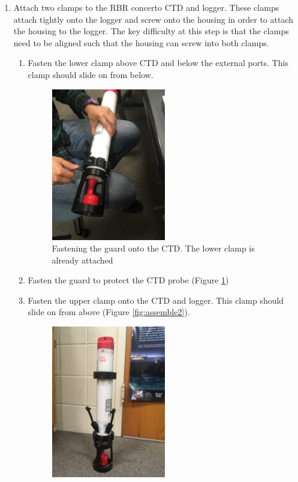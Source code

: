 \documentclass[13pt]{article}
\begin{document}
\begin{enumerate}
    \item Attach two clamps to the RBR concerto CTD and logger. These clamps attach tightly onto the logger and screw onto the housing in order to attach the housing to the logger. The key difficulty at this step is that the clamps need to be aligned such that the housing can screw into both clamps.
    \begin{enumerate}
        \item Fasten the lower clamp above CTD and below the external ports. This clamp should slide on from below.
\begin{figure}
    \centering
    \includegraphics[width = 0.5\textwidth]{IMG_1639.JPG}
    \caption{Fastening the guard onto the CTD. The lower clamp is already attached}
    \label{fig:assemble1}
\end{figure}
        \item Fasten the guard to protect the CTD probe (Figure \ref{fig:assemble1})
        \item Fasten the upper clamp onto the CTD and logger. This clamp should slide on from above (Figure \ref{fig:assemble2}).
\begin{figure}
    \centering
    \includegraphics[width = 0.5\textwidth]{IMG_1640.JPG}

\end{figure}
\end{enumerate}
\end{enumerate}
\end{document}

